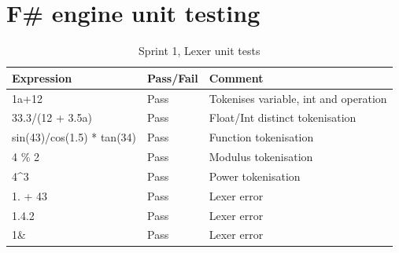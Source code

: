 \documentclass[a4paper, oneside, 11pt]{report}
\begin{document}
\section{F\# engine unit testing}

\begin{table}[h]
\caption{Sprint 1, Lexer unit tests}
\label{sprint1-lexer-test}
\begin{tabular}{|l|l|l|}
\hline
\textbf{Expression}        & \textbf{Pass/Fail} & \textbf{Comment}                      \\ \hline
1a+12                      & Pass               & Tokenises variable, int and operation \\ \hline
33.3/(12 + 3.5a)           & Pass               & Float/Int distinct tokenisation       \\ \hline
sin(43)/cos(1.5) * tan(34) & Pass               & Function tokenisation                 \\ \hline
4 \% 2                     & Pass               & Modulus tokenisation                  \\ \hline
4\textasciicircum{}3       & Pass               & Power tokenisation                    \\ \hline
1. + 43                    & Pass               & Lexer error                           \\ \hline
1.4.2                      & Pass               & Lexer error                           \\ \hline
1\&                        & Pass               & Lexer error                           \\ \hline
\end{tabular}
\end{table}
\end{document}
